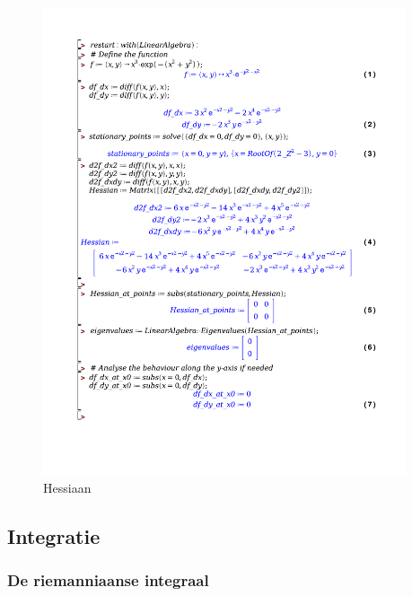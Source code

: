 \documentclass[a4paper]{report}
\begin{document}
\begin{figure}[H]
	\begin{center}
		\includegraphics[width=0.95\textwidth]{./hessian.pdf}
	\end{center}
	\caption{Hessiaan}
	\label{}
\end{figure}

\subsection{Integratie}

\subsubsection{De riemanniaanse integraal}
\end{document}
